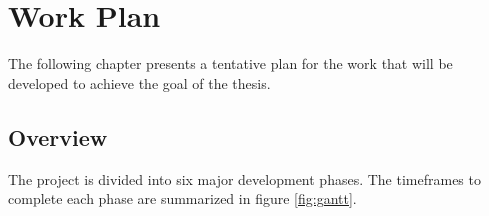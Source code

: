 

\chapter{Work Plan}
\label{cha:work_plan}

The following chapter presents a tentative plan for the work that will be developed to achieve the goal of the thesis.


\section{Overview}

The project is divided into six major development phases. The timeframes to complete each phase are summarized in figure \ref{fig:gantt}.



